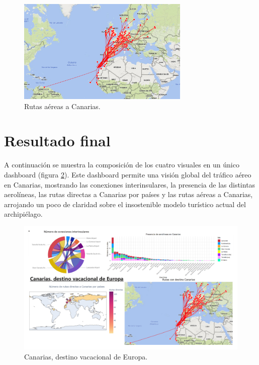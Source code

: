 \documentclass[11pt]{opticajnl}
\begin{document}
\begin{figure}[H]
\centering
\includegraphics[width=0.73\textwidth]{fotos/flow_map.png}
\caption{Rutas aéreas a Canarias.}
\label{fig:flow_map}
\end{figure}

\section{Resultado final}

A continuación se muestra la composición de los cuatro visuales en un único dashboard (figura \ref{fig:dashboard}). Este dashboard permite una visión global del tráfico aéreo en Canarias, mostrando las conexiones interinsulares, la presencia de las distintas aerolíneas, las rutas directas a Canarias por países y las rutas aéreas a Canarias, arrojando un poco de claridad sobre el insostenible modelo turístico actual del archipiélago.

\begin{figure}[H]
\centering
\includegraphics[width=\textwidth]{fotos/PowerBI_LuisArdevol.pdf}
\caption{Canarias, destino vacacional de Europa.}
\label{fig:dashboard}
\end{figure}
\end{document}

